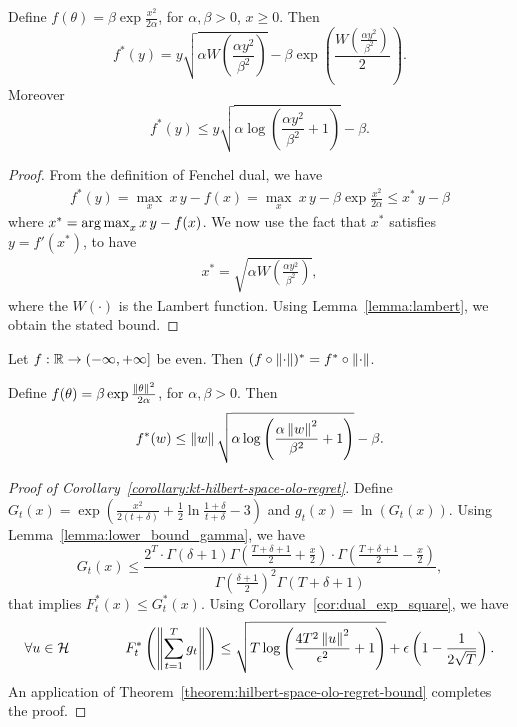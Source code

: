 \begin{lemma}
Define $f(\theta)= \beta \exp\frac{x^2}{2 \alpha}$, for $\alpha,\beta>0$, $x\geq0$. Then
\[
f^*(y)=y \sqrt{\alpha W\left(\frac{\alpha y^2}{\beta^2}\right)} - \beta \exp\left(\frac{W\left(\frac{\alpha y^2}{\beta^2}\right)}{2}\right).
\]
Moreover
\[
f^*(y) \leq y \sqrt{\alpha \log \left(\frac{\alpha y^2}{\beta^2} +1 \right)} - \beta.
\]
\end{lemma}
\begin{proof}
From the definition of Fenchel dual, we have
\begin{align*}
f^*(y)= \max_{x} \  x\, y - f(x) = \max_{x} \  x\, y - \beta \exp\frac{x^2}{2 \alpha} \leq x^*\,y -\beta
\end{align*}
where $x^*= \operatorname*{arg\,max}_{x} x\, y - f(x)$. We now use the fact that $x^*$ satisfies $y = f'(x^*)$, to have
\begin{align*}
x^*=\sqrt{\alpha W\left(\frac{\alpha y^2}{\beta^2}\right)},
\end{align*}
where the $W(\cdot)$ is the Lambert function.
Using Lemma~\ref{lemma:lambert}, we obtain the stated bound.
\end{proof}

\begin{lemma}
Let $f:\mathbb{R} \rightarrow (-\infty, +\infty]$ be even. Then $(f \circ \left\|{\cdot}\right\|)^*=f^* \circ \left\|{\cdot}\right\|$.
\end{lemma}

\begin{corollary}
\label{cor:dual_exp_square}
Define $f(\theta)= \beta \exp\frac{\left\|{\theta}\right\|^2}{2 \alpha}$, for $\alpha,\beta>0$. Then
\[
f^*(w) \leq  \left\|{w}\right\| \sqrt{\alpha \log \left(\frac{\alpha \left\|{w}\right\|^2}{\beta^2} +1 \right)} - \beta.
\]
\end{corollary}


\begin{proof}[Proof of Corollary~\ref{corollary:kt-hilbert-space-olo-regret}]
Define $G_t(x)=\exp\left(\frac{x^2}{2(t+\delta)} +\frac{1}{2} \ln \frac{1+\delta}{t+\delta} -3\right)$ and $g_t(x)=\ln(G_t(x))$.
Using Lemma~\ref{lemma:lower_bound_gamma}, we have
\[
G_t(x) \leq \frac{2^T \cdot \Gamma(\delta+1) \Gamma \left(\frac{T+\delta+1}{2} + \frac{x}{2} \right) \cdot \Gamma \left(\frac{T+\delta+1}{2} - \frac{x}{2} \right)}{ \Gamma(\frac{\delta+1}{2})^2 \Gamma(T+\delta+1)},
\]
that implies $F^*_t(x) \leq G_t^*(x)$.
Using Corollary~\ref{cor:dual_exp_square}, we have
\[
\forall u \in \mathcal{H} \qquad \qquad
F^*_t\left(\left\| \sum_{t=1}^T g_t \right\|\right)
\leq \sqrt{T \log \left(\frac{4 T^2 \left\|{u}\right\|^2}{\epsilon^2} +1 \right)}+\epsilon\left(1-\frac{1}{2\sqrt{T}}\right).
\]
An application of Theorem~\ref{theorem:hilbert-space-olo-regret-bound} completes the proof.
\end{proof}

